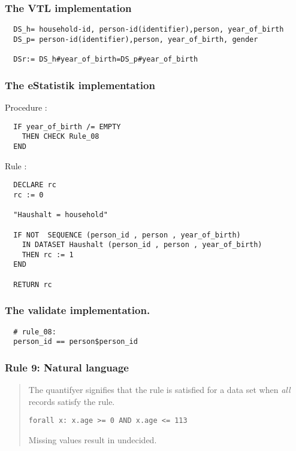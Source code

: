 \subsubsection*{The VTL implementation}
\begin{verbatim}
  DS_h= household-id, person-id(identifier),person, year_of_birth
  DS_p= person-id(identifier),person, year_of_birth, gender

  DSr:= DS_h#year_of_birth=DS_p#year_of_birth
\end{verbatim}
\subsubsection*{The eStatistik implementation}
\noindent
Procedure :
\begin{verbatim}
  IF year_of_birth /= EMPTY
    THEN CHECK Rule_08
  END
\end{verbatim}
\noindent
Rule :
\begin{verbatim}
  DECLARE rc
  rc := 0

  "Haushalt = household"

  IF NOT  SEQUENCE (person_id , person , year_of_birth) 
    IN DATASET Haushalt (person_id , person , year_of_birth)
    THEN rc := 1
  END

  RETURN rc
\end{verbatim}

\subsubsection*{The validate implementation.}
\begin{verbatim}
  # rule_08:
  person_id == person$person_id
\end{verbatim}


\newpage

\subsubsection*{  Rule 9: Natural language}
\begin{quote}


The  quantifyer signifies that the rule is satisfied for a data set when \emph{all} records satisfy the rule.

\begin{verbatim}
forall x: x.age >= 0 AND x.age <= 113
\end{verbatim}

Missing values result in undecided.


\end{quote}
